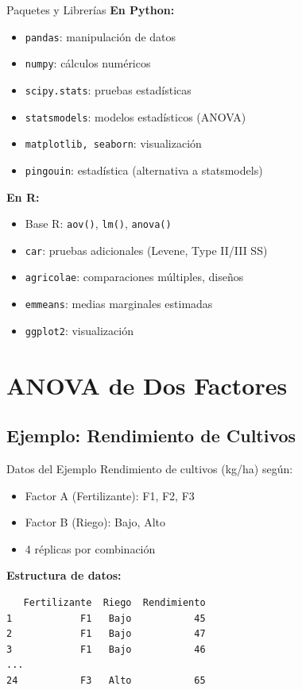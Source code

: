 \documentclass[aspectratio=169]{beamer}
\begin{document}
\begin{frame}{Paquetes y Librerías}
\textbf{En Python:}
\begin{itemize}
\item \texttt{pandas}: manipulación de datos
\item \texttt{numpy}: cálculos numéricos
\item \texttt{scipy.stats}: pruebas estadísticas
\item \texttt{statsmodels}: modelos estadísticos (ANOVA)
\item \texttt{matplotlib, seaborn}: visualización
\item \texttt{pingouin}: estadística (alternativa a statsmodels)
\end{itemize}

\vspace{0.3cm}

\textbf{En R:}
\begin{itemize}
\item Base R: \texttt{aov()}, \texttt{lm()}, \texttt{anova()}
\item \texttt{car}: pruebas adicionales (Levene, Type II/III SS)
\item \texttt{agricolae}: comparaciones múltiples, diseños
\item \texttt{emmeans}: medias marginales estimadas
\item \texttt{ggplot2}: visualización
\end{itemize}
\end{frame}

\section{ANOVA de Dos Factores}

\subsection{Ejemplo: Rendimiento de Cultivos}

\begin{frame}[fragile]{Datos del Ejemplo}
\small
Rendimiento de cultivos (kg/ha) según:
\begin{itemize}
\item Factor A (Fertilizante): F1, F2, F3
\item Factor B (Riego): Bajo, Alto
\item 4 réplicas por combinación
\end{itemize}

\vspace{0.2cm}

\textbf{Estructura de datos:}
\begin{verbatim}
   Fertilizante  Riego  Rendimiento
1            F1   Bajo           45
2            F1   Bajo           47
3            F1   Bajo           46
...
24           F3   Alto           65
\end{verbatim}
\end{frame}
\end{document}

